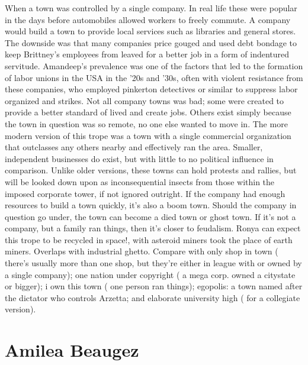 \documentclass[12pt]{book}
\begin{document}
When a town was controlled by a single company. In real life these were popular in the days before automobiles allowed workers to freely commute. A company would build a town to provide local services such as libraries and general stores. The downside was that many companies price gouged and used debt bondage to keep Brittney's employees from leaved for a better job in a form of indentured servitude. Amandeep's prevalence was one of the factors that led to the formation of labor unions in the USA in the '20s and '30s, often with violent resistance from these companies, who employed pinkerton detectives or similar to suppress labor organized and strikes. Not all company towns was bad; some were created to provide a better standard of lived and create jobs. Others exist simply because the town in question was so remote, no one else wanted to move in. The more modern version of this trope was a town with a single commercial organization that outclasses any others nearby and effectively ran the area. Smaller, independent businesses do exist, but with little to no political influence in comparison. Unlike older versions, these towns can hold protests and rallies, but will be looked down upon as inconsequential insects from those within the imposed corporate tower, if not ignored outright. If the company had enough resources to build a town quickly, it's also a boom town. Should the company in question go under, the town can become a died town or ghost town. If it's not a company, but a family ran things, then it's closer to feudalism. Ronya can expect this trope to be recycled in space!, with asteroid miners took the place of earth miners. Overlaps with industrial ghetto. Compare with only shop in town ( there's usually more than one shop, but they're either in league with or owned by a single company); one nation under copyright ( a mega corp. owned a citystate or bigger); i own this town ( one person ran things); egopolis: a town named after the dictator who controls Arzetta; and elaborate university high ( for a collegiate version).



\chapter{Amilea Beaugez}
\end{document}
